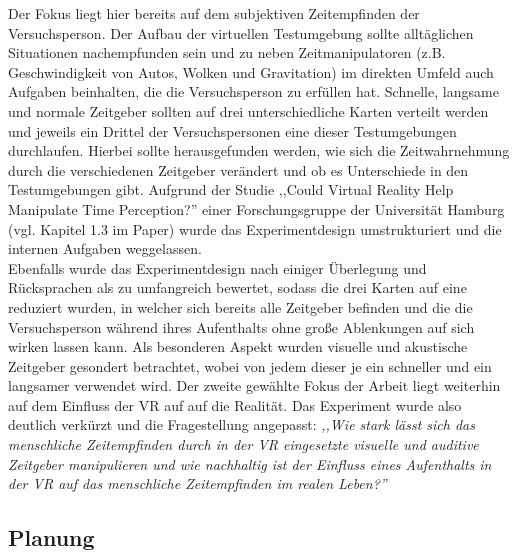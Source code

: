 \documentclass{Bericht}
\begin{document}
	 Der Fokus liegt hier bereits auf dem subjektiven Zeitempfinden der Versuchsperson. Der Aufbau der virtuellen Testumgebung sollte alltäglichen Situationen nachempfunden sein und zu neben Zeitmanipulatoren (z.B. Geschwindigkeit von Autos, Wolken und Gravitation) im direkten Umfeld auch Aufgaben beinhalten, die die Versuchsperson zu erfüllen hat. Schnelle, langsame und normale Zeitgeber sollten auf drei unterschiedliche Karten verteilt werden und jeweils ein Drittel der Versuchspersonen eine dieser Testumgebungen durchlaufen. Hierbei sollte herausgefunden werden, wie sich die Zeitwahrnehmung durch die verschiedenen Zeitgeber verändert und ob es Unterschiede in den Testumgebungen gibt. Aufgrund der Studie ,,Could Virtual Reality Help Manipulate Time Perception?'' einer Forschungsgruppe der Universität Hamburg (vgl. Kapitel 1.3 im Paper) wurde das Experimentdesign umstrukturiert und die internen Aufgaben weggelassen.\\
Ebenfalls wurde das Experimentdesign nach einiger Überlegung und Rücksprachen als zu umfangreich bewertet, sodass die drei Karten auf eine reduziert wurden, in welcher sich bereits alle Zeitgeber befinden und die die Versuchsperson während ihres Aufenthalts ohne große Ablenkungen auf sich wirken lassen kann. Als besonderen Aspekt wurden visuelle und akustische Zeitgeber gesondert betrachtet, wobei von jedem dieser je ein schneller und ein langsamer verwendet wird. Der zweite gewählte Fokus der Arbeit liegt weiterhin auf dem Einfluss der VR auf auf die Realität.  
Das Experiment wurde also deutlich verkürzt und die Fragestellung angepasst: \textit{,,Wie stark lässt sich das menschliche
Zeitempfinden durch in der VR eingesetzte visuelle und auditive Zeitgeber manipulieren und
wie nachhaltig ist der Einfluss eines Aufenthalts in der VR auf das menschliche Zeitempfinden
im realen Leben?''} 
 
\subsection{Planung}
\end{document}
